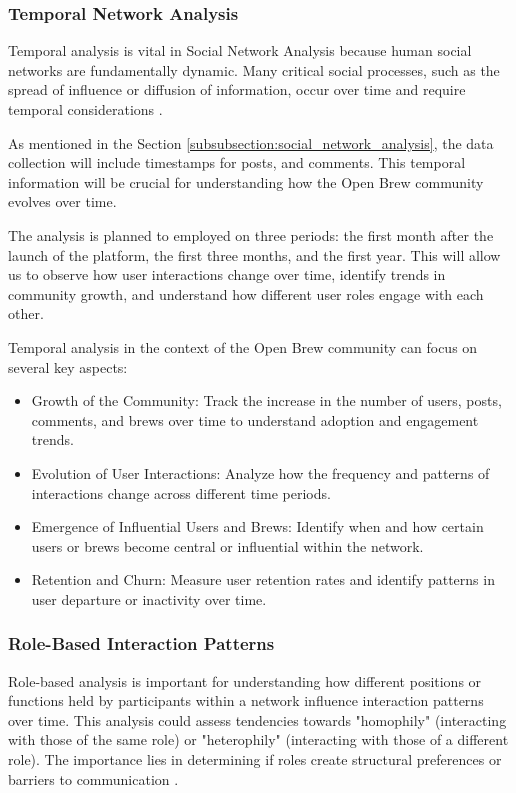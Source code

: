 \documentclass[12pt]{article}
\begin{document}
\subsubsection{Temporal Network Analysis}
\label{subsubsection:temporal_network_analysis}
Temporal analysis is vital in Social Network Analysis because human social networks are fundamentally dynamic. Many critical social processes, such as the spread of influence or diffusion of information, occur over time and require temporal considerations \cite{robins2013tutorial}.

As mentioned in the Section \ref{subsubsection:social_network_analysis}, the data collection will include timestamps for posts, and comments. This temporal information will be crucial for understanding how the Open Brew community evolves over time.

The analysis is planned to employed on three periods: the first month after the launch of the platform, the first three months, and the first year. This will allow us to observe how user interactions change over time, identify trends in community growth, and understand how different user roles engage with each other.

Temporal analysis in the context of the Open Brew community can focus on several key aspects:

\begin{itemize}
    \item Growth of the Community: Track the increase in the number of users, posts, comments, and brews over time to understand adoption and engagement trends.
    \item Evolution of User Interactions: Analyze how the frequency and patterns of interactions change across different time periods.
    \item Emergence of Influential Users and Brews: Identify when and how certain users or brews become central or influential within the network.
    \item Retention and Churn: Measure user retention rates and identify patterns in user departure or inactivity over time.
\end{itemize}

\subsubsection{Role-Based Interaction Patterns}
\label{subsubsection:role_based_interaction_patterns}
Role-based analysis is important for understanding how different positions or functions held by participants within a network influence interaction patterns over time. This analysis could assess tendencies towards "homophily" (interacting with those of the same role) or "heterophily" (interacting with those of a different role). The importance lies in determining if roles create structural preferences or barriers to communication \cite{stepanyan2014culture}.
\end{document}
